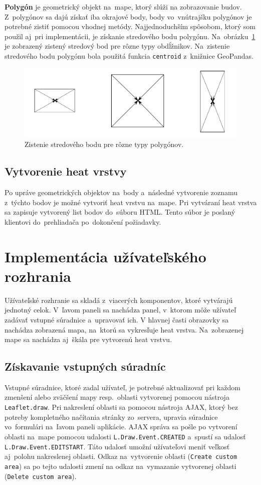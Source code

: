 \textbf{Polygón} je geometrický objekt na~mape, ktorý slúži na zobrazovanie budov. Z~polygónov sa dajú získať iba okrajové body, body vo~vnútrajšku polygónov je potrebné zistiť pomocou vhodnej metódy. Najjednoduchším spôsobom, ktorý som použil aj~pri implementácii, je získanie stredového bodu polygónu. Na~obrázku~\ref{fig:polygon-center} je zobrazený zistený stredový bod pre rôzne typy obdĺžnikov. Na~zistenie stredového bodu polygónu bola použitá funkcia \texttt{centroid} z~knižnice GeoPandas.

\begin{figure}[ht]
    \centering
    \includegraphics[width=0.8\linewidth]{obrazky-figures/polygon-center.pdf}
    \caption{Zistenie stredového bodu pre rôzne typy polygónov.}
    \label{fig:polygon-center}
\end{figure}

\subsection*{Vytvorenie heat vrstvy}
Po upráve geometrických objektov na~body a~následné vytvorenie zoznamu z~týchto bodov je možné vytvoriť heat vrstvu na~mape. Pri vytváraní heat vrstva sa zapisuje vytvorený list bodov do~súboru HTML. Tento súbor je poslaný klientovi do~prehliadača po~dokončení požiadavky.


\section{Implementácia užívateľského rozhrania}
Užívateľské rozhranie sa skladá z~viacerých komponentov, ktoré vytvárajú jednotný celok. V~ľavom paneli sa nachádza panel, v~ktorom môže užívateľ zadávať vstupné súradnice a~upravovať ich. V hlavnej časti obrazovky sa nachádza zobrazená mapa, na~ktorú sa vykresľuje heat vrstva. Na~zobrazenej mape sa nachádza aj~škála pre vytvorenú heat vrstvu. 

\subsection*{Získavanie vstupných súradníc}
Vstupné súradnice, ktoré zadal užívateľ, je potrebné aktualizovať pri každom zmenšení alebo zväčšení mapy resp.~oblasti vytvorenej pomocou nástroja \texttt{Leaflet.draw}. Pri nakreslení oblasti sa pomocou nástroja AJAX, ktorý bez potreby kompletného načítania stránky zo~servera, upravia súradnice vo~formulári na~ľavom paneli aplikácie. AJAX správa sa pošle po vytvorení oblasti na~mape pomocou udalosti \texttt{L.Draw.Event.CREATED} a~spustí sa udalosť \texttt{L.Draw.Event.EDITSTART}. Táto udalosť umožní užívateľovi meniť veľkosť aj~polohu nakreslenej oblasti. Odkaz na~vytvorenie oblasti (\texttt{Create custom area}) sa po tejto udalosti zmení na odkaz na~vymazanie vytvorenej oblasti (\texttt{Delete custom area}).

